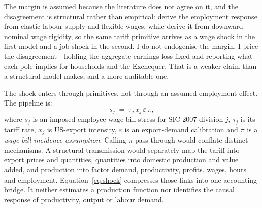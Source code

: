 The margin is assumed because the literature does not agree on it, and the disagreement is structural rather than empirical: \citet{ignatenko2025} derive the employment response from elastic labour supply and flexible wages, while \citet{rodriguezclare2025} derive it from downward nominal wage rigidity, so the same tariff primitive arrives as a wage shock in the first model and a job shock in the second. I do not endogenise the margin. I price the disagreement---holding the aggregate earnings loss fixed and reporting what each pole implies for households and the Exchequer. That is a weaker claim than a structural model makes, and a more auditable one.

The shock enters through primitives, not through an assumed employment effect. The pipeline is:
\begin{equation}
s_j \;=\; \tau_j \, x_j \, \varepsilon \, \pi,
\label{eq:shock}
\end{equation}
where $s_j$ is an imposed employee-wage-bill stress for SIC 2007 division $j$, $\tau_j$ is its tariff rate, $x_j$ is US-export intensity, $\varepsilon$ is an export-demand calibration and $\pi$ is a \emph{wage-bill-incidence assumption}. Calling $\pi$ pass-through would conflate distinct mechanisms. A structural transmission would separately map the tariff into export prices and quantities, quantities into domestic production and value added, and production into factor demand, productivity, profits, wages, hours and employment. Equation~\eqref{eq:shock} compresses those links into one accounting bridge. It neither estimates a production function nor identifies the causal response of productivity, output or labour demand.

